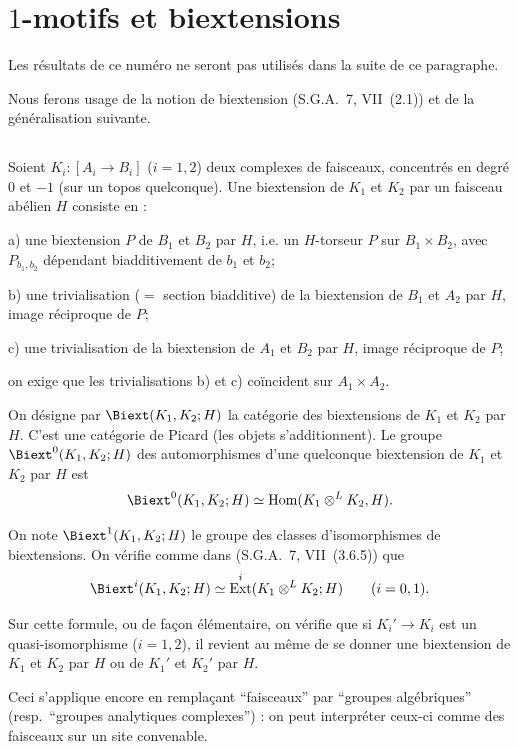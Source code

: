 \documentclass[12pt,a4paper]{amsart}
\theoremstyle{plain}
\theoremstyle{definition}
\theoremstyle{remark}
\DeclareMathOperator{\Hom}{Hom}
\DeclareMathOperator{\Ext}{Ext}
\numberwithin{equation}{section}
\begin{document}
\section{$1$-motifs et biextensions}\label{sec:10.2}

Les résultats de ce numéro ne seront pas utilisés dans la suite de ce paragraphe.

Nous ferons usage de la notion de biextension (S.G.A.~7, VII~(2.1)) et de la généralisation suivante.

\subsection{}\label{10.2.1}
Soient $K_i:[A_i\to B_i]$ ($i=1,2$) deux complexes de faisceaux, concentrés en degré $0$ et $-1$ (sur un topos quelconque). Une biextension de $K_1$ et $K_2$ par un faisceau abélien $H$ consiste en :

a) une biextension $P$ de $B_1$ et $B_2$ par $H$, i.e. un $H$-torseur $P$ sur $B_1\times B_2$, avec $P_{b_1,b_2}$ dépendant biadditivement de $b_1$ et $b_2$;

b) une trivialisation ($=$ section biadditive) de la biextension de $B_1$ et $A_2$ par $H$, image réciproque de $P$;

c) une trivialisation de la biextension de $A_1$ et $B_2$ par $H$, image réciproque de $P$;

on exige que les trivialisations b) et c) coïncident sur $A_1\times A_2$.

On désigne par $\Biext(K_1,K_2;H)$ la catégorie des biextensions de $K_1$ et $K_2$ par $H$. C'est une catégorie de Picard (les objets s'additionnent). Le groupe $\Biext^0(K_1,K_2;H)$ des automorphismes d'une quelconque biextension de $K_1$ et $K_2$ par $H$ est
\[
\Biext^0(K_1,K_2;H)\simeq\Hom(K_1\otimes^L K_2,H).
\]

On note $\Biext^1(K_1,K_2;H)$ le groupe des classes d'isomorphismes de biextensions. On vérifie comme dans (S.G.A.~7, VII~(3.6.5)) que
\[
\Biext^i(K_1,K_2;H)\simeq\Ext^i(K_1\otimes^L K_2;H) \qquad (i=0,1).
\]

Sur cette formule, ou de façon élémentaire, on vérifie que si $K_i'\to K_i$ est un quasi-isomorphisme ($i=1,2$), il revient au même de se donner une biextension de $K_1$ et $K_2$ par $H$ ou de $K_1'$ et $K_2'$ par $H$.

Ceci s'applique encore en remplaçant ``faisceaux'' par ``groupes algébriques'' (resp.~``groupes analytiques complexes'') : on peut interpréter ceux-ci comme des faisceaux sur un site convenable.
\end{document}
